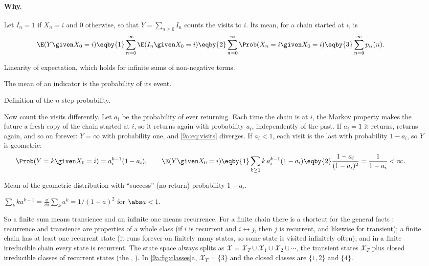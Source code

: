 \paragraph{Why.}
Let $I_n=1$ if $X_n=i$ and $0$ otherwise, so that $Y=\sum_{n\ge0}I_n$ counts the visits to $i$.
Its mean, for a chain started at $i$, is
\begin{align}
  \E(Y\given X_0=i)
  &\eqby{1}\sum_{n=0}^\infty\E(I_n\given X_0=i)
   \eqby{2}\sum_{n=0}^\infty\Prob(X_n=i\given X_0=i)
   \eqby{3}\sum_{n=0}^\infty p_{ii}(n) .
  \label{9a:eq:visits}
\end{align}
\begin{explain}
  \item Linearity of expectation, which holds for infinite sums of non-negative terms.
  \item The mean of an indicator is the probability of its event.
  \item Definition of the $n$-step probability.
\end{explain}
Now count the visits differently. Let $a_i$ be the probability of ever returning. Each time
the chain is at $i$, the Markov property makes the future a fresh copy of the chain started at
$i$, so it returns again with probability $a_i$, independently of the past. If $a_i=1$ it
returns, returns again, and so on forever: $Y=\infty$ with probability one, and
\eqref{9a:eq:visits} diverges. If $a_i<1$, each visit is the last with probability $1-a_i$, so
$Y$ is geometric:
\begin{align*}
  \Prob(Y=k\given X_0=i)=a_i^{k-1}(1-a_i),\qquad
  \E(Y\given X_0=i)
  &\eqby{1}\sum_{k\ge1}k\,a_i^{k-1}(1-a_i)
   \eqby{2}\frac{1-a_i}{(1-a_i)^2}=\frac{1}{1-a_i}<\infty .
\end{align*}
\begin{explain}
  \item Mean of the geometric distribution with ``success'' (no return) probability $1-a_i$.
  \item $\sum_kka^{k-1}=\frac{\dd}{\dd a}\sum_ka^k=1/(1-a)^2$ for $\abs a<1$.
\end{explain}
So a finite sum means transience and an infinite one means recurrence. For a finite chain
there is a shortcut for the general facts : recurrence and
transience are properties of a whole class (if $i$ is recurrent and $i\leftrightarrow j$, then
$j$ is recurrent, and likewise for transient); a finite chain has at least one recurrent state
(it runs forever on finitely many states, so some state is visited infinitely often); and in a
finite irreducible chain every state is recurrent. The state space always splits as
$\mathcal X=\mathcal X_T\cup\mathcal X_1\cup\mathcal X_2\cup\cdots$, the transient states
$\mathcal X_T$ plus closed irreducible classes of recurrent states (the , ). In \cref{9a:fig:classes}a, $\mathcal X_T=\{3\}$ and the
closed classes are $\{1,2\}$ and $\{4\}$.


